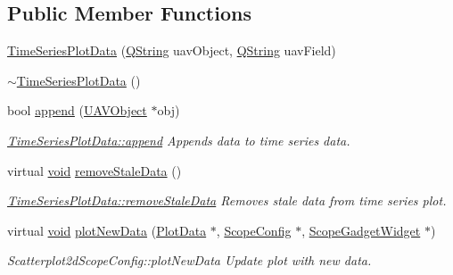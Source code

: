 \subsection*{\-Public \-Member \-Functions}
\begin{DoxyCompactItemize}
\item 
\hyperlink{group___scope_plugin_gaee4fb8258165729e7db0a3e37f619245}{\-Time\-Series\-Plot\-Data} (\hyperlink{group___u_a_v_objects_plugin_gab9d252f49c333c94a72f97ce3105a32d}{\-Q\-String} uav\-Object, \hyperlink{group___u_a_v_objects_plugin_gab9d252f49c333c94a72f97ce3105a32d}{\-Q\-String} uav\-Field)
\item 
\hyperlink{group___scope_plugin_gada4c361665eb2f78ad8768e8f25a9786}{$\sim$\-Time\-Series\-Plot\-Data} ()
\item 
bool \hyperlink{group___scope_plugin_ga35573edecad8799fae6df0ed2a47638a}{append} (\hyperlink{class_u_a_v_object}{\-U\-A\-V\-Object} $\ast$obj)
\begin{DoxyCompactList}\small\item\em \hyperlink{group___scope_plugin_ga35573edecad8799fae6df0ed2a47638a}{\-Time\-Series\-Plot\-Data\-::append} \-Appends data to time series data. \end{DoxyCompactList}\item 
virtual \hyperlink{group___u_a_v_objects_plugin_ga444cf2ff3f0ecbe028adce838d373f5c}{void} \hyperlink{group___scope_plugin_gaed5772c910e2434ae0d99aee7d0fd829}{remove\-Stale\-Data} ()
\begin{DoxyCompactList}\small\item\em \hyperlink{group___scope_plugin_gaed5772c910e2434ae0d99aee7d0fd829}{\-Time\-Series\-Plot\-Data\-::remove\-Stale\-Data} \-Removes stale data from time series plot. \end{DoxyCompactList}\item 
virtual \hyperlink{group___u_a_v_objects_plugin_ga444cf2ff3f0ecbe028adce838d373f5c}{void} \hyperlink{group___scope_plugin_gab0866f798b0b322c20aa33e85a3a6296}{plot\-New\-Data} (\hyperlink{class_plot_data}{\-Plot\-Data} $\ast$, \hyperlink{class_scope_config}{\-Scope\-Config} $\ast$, \hyperlink{class_scope_gadget_widget}{\-Scope\-Gadget\-Widget} $\ast$)
\begin{DoxyCompactList}\small\item\em \-Scatterplot2d\-Scope\-Config\-::plot\-New\-Data \-Update plot with new data. \end{DoxyCompactList}\end{DoxyCompactItemize}


